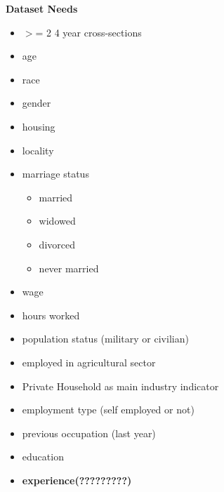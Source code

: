 
\let\counterwithout\relax
\let\counterwithin\relax
{}


\noindent \textbf{Dataset Needs}\\
\begin{itemize}
	\item $>$= 2 4 year cross-sections
	\item age
	\item race
	\item gender
	\item housing
	\item locality
	\item marriage status
	\begin{itemize}
		\item married
		\item widowed
		\item divorced
		\item never married
	\end{itemize}
	\item wage
	\item hours worked
	\item population status (military or civilian)
	\item employed in agricultural sector
	\item Private Household as main industry indicator
	\item employment type (self employed or not)
	\item previous occupation (last year)
	\item education
	\item \textbf{experience(?????????)}
\end{itemize}

